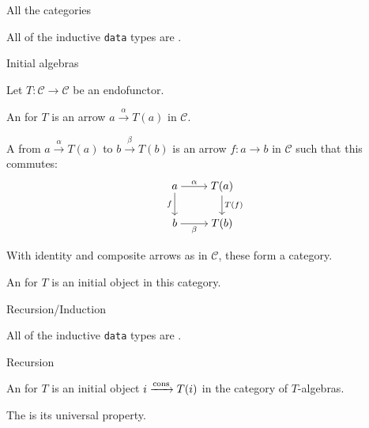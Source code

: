 
\begin{frame}{All the categories} %
  
  \par All of the inductive \texttt{data} types are .

  \begin{block}{Initial algebras}
    
    \par Let $T : \mathcal{C} \to \mathcal{C}$ be an endofunctor.
    \vspace{0.5 \baselineskip}
    \pause
    \par An  for $T$ is an arrow $a \xrightarrow{\alpha} T(a)$ in $\mathcal{C}$.
    \vspace{0.5 \baselineskip}
    \pause
    \par A  from $a \xrightarrow{\alpha} T(a)$ to $b \xrightarrow{\beta} T(b)$ is an arrow $f : a \to b$ in $\mathcal{C}$ such that this commutes:
    \begin{align*}
      \begin{tikzcd}[cramped, ampersand replacement = \;]
        a \arrow[r, "\alpha"] \arrow[d, "f"'] \; T(a) \arrow[d, "T(f)"] \\
        b \arrow[r, "\beta"'] \; T(b)
      \end{tikzcd}
    \end{align*}
    \vspace{-0.5 \baselineskip}
    \pause
    \par With identity and composite arrows as in $\mathcal{C}$, these form a category.
    \vspace{0.5 \baselineskip}
    \pause
    \par An  for $T$ is an initial object in this category.
    
  \end{block}

\end{frame}

\begin{frame}{Recursion/Induction} %

  \par All of the inductive \texttt{data} types are .
  
  \pause
  
  \begin{block}{Recursion}

    \par An  for $T$ is an initial object $i \xrightarrow{\operatorname{cons}} T(i)$ in the category of $T$-algebras.
    \vspace{0.5 \baselineskip}
    \pause
    \par The  is its universal property.
    
  \end{block}

\end{frame}

